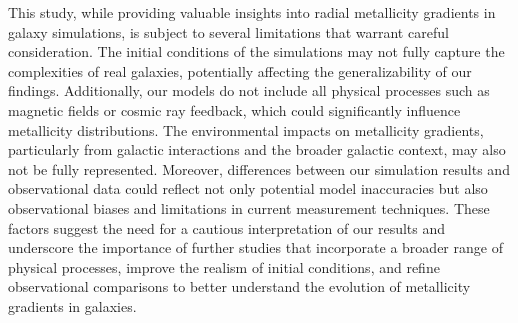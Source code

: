 \documentclass[fleqn,usenatbib]{mnras}
\begin{document}
This study, while providing valuable insights into radial metallicity gradients in galaxy simulations, is subject to several limitations that warrant careful consideration. The initial conditions of the simulations may not fully capture the complexities of real galaxies, potentially affecting the generalizability of our findings. Additionally, our models do not include all physical processes such as magnetic fields or cosmic ray feedback, which could significantly influence metallicity distributions. The environmental impacts on metallicity gradients, particularly from galactic interactions and the broader galactic context, may also not be fully represented. Moreover, differences between our simulation results and observational data could reflect not only potential model inaccuracies but also observational biases and limitations in current measurement techniques. These factors suggest the need for a cautious interpretation of our results and underscore the importance of further studies that incorporate a broader range of physical processes, improve the realism of initial conditions, and refine observational comparisons to better understand the evolution of metallicity gradients in galaxies.
\end{document}

